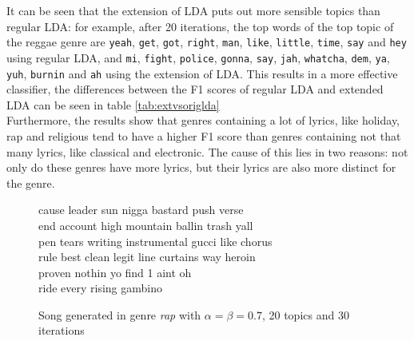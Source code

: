 It can be seen that the extension of LDA puts out more sensible topics than regular LDA: for example, after 20 iterations, the top words of the top topic of the reggae genre are \verb|yeah|, \verb|get|, \verb|got|, \verb|right|, \verb|man|, \verb|like|, \verb|little|, \verb|time|, \verb|say| and \verb|hey| using regular LDA, and \verb|mi|, \verb|fight|, \verb|police|, \verb|gonna|, \verb|say|, \verb|jah|, \verb|whatcha|, \verb|dem|, \verb|ya|, \verb|yuh|, \verb|burnin| and \verb|ah| using the extension of LDA. This results in a more effective classifier, the differences between the F1 scores of regular LDA and extended LDA can be seen in table \ref{tab:extvsoriglda} \\
Furthermore, the results show that genres containing a lot of lyrics, like holiday, rap and religious tend to have a higher F1 score than genres containing not that many lyrics, like classical and electronic. The cause of this lies in two reasons: not only do these genres have more lyrics, but their lyrics are also more distinct for the genre. 




\begin{figure}
\begin{mdframed}
cause leader sun nigga bastard push verse \\
end account high mountain ballin trash yall \\
pen tears writing instrumental gucci like chorus \\
rule best clean legit line curtains way heroin \\
proven nothin yo find 1 aint oh \\
ride every rising gambino
\caption{Song generated in genre \textit{rap} with $\alpha=\beta=0.7$, 20 topics and 30 iterations}
 \end{mdframed}
\label{text:rap_song}
\end{figure}